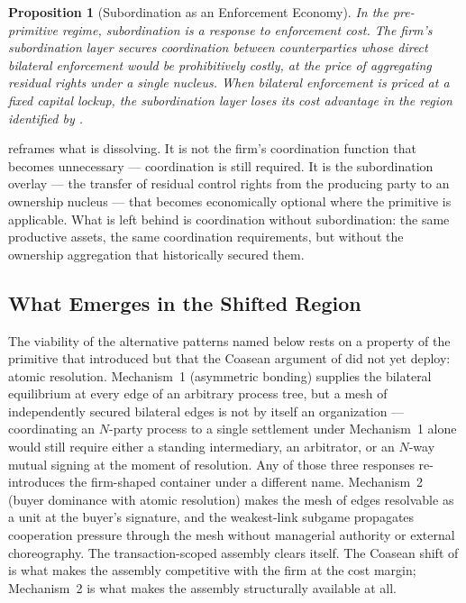 \documentclass[11pt,a4paper]{article}
\newtheorem{proposition}[theorem]{Proposition}
\theoremstyle{definition}
\theoremstyle{remark}
\begin{document}
\begin{proposition}[Subordination as an Enforcement Economy]
\label{prop:subordination}
In the pre-primitive regime, subordination is a response to
enforcement cost. The firm's subordination layer secures
coordination between counterparties whose direct bilateral
enforcement would be prohibitively costly, at the price of
aggregating residual rights under a single nucleus. When bilateral
enforcement is priced at a fixed capital lockup, the subordination
layer loses its cost advantage in the region identified by
.
\end{proposition}

 reframes what is dissolving. It is not
the firm's coordination function that becomes unnecessary ---
coordination is still required. It is the subordination overlay ---
the transfer of residual control rights from the producing party to
an ownership nucleus --- that becomes economically optional where
the primitive is applicable. What is left behind is coordination
without subordination: the same productive assets, the same
coordination requirements, but without the ownership aggregation
that historically secured them.

\subsection{What Emerges in the Shifted Region}

The viability of the alternative patterns named below rests on a
property of the primitive that  introduced but
that the Coasean argument of  did not yet
deploy: atomic resolution. Mechanism~1 (asymmetric bonding)
supplies the bilateral equilibrium at every edge of an arbitrary
process tree, but a mesh of independently secured bilateral edges
is not by itself an organization --- coordinating an
$N$-party process to a single settlement under Mechanism~1 alone
would still require either a standing intermediary, an arbitrator,
or an $N$-way mutual signing at the moment of resolution. Any of
those three responses re-introduces the firm-shaped container
under a different name. Mechanism~2 (buyer dominance with atomic
resolution) makes the mesh of edges resolvable as a unit at the
buyer's signature, and the weakest-link subgame propagates
cooperation pressure through the mesh without managerial
authority or external choreography.
The transaction-scoped assembly clears itself. The Coasean shift
of  is what makes the assembly competitive
with the firm at the cost margin; Mechanism~2 is what makes the
assembly structurally available at all.
\end{document}
